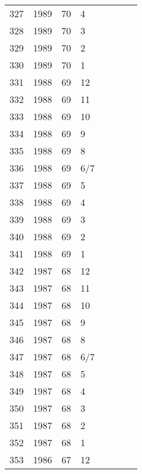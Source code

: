 \begin{longtable}{ |l|l|l|l|l|l|l|l| }
327 & 1989 & 70 &     4 &         &                &  & \\
328 & 1989 & 70 &     3 &         &                &  & \\
329 & 1989 & 70 &     2 &         &                &  & \\
330 & 1989 & 70 &     1 &         &                &  & \\
331 & 1988 & 69 &    12 &         &                &  & \\
332 & 1988 & 69 &    11 &         &                &  & \\
333 & 1988 & 69 &    10 &         &                &  & \\
334 & 1988 & 69 &     9 &         &                &  & \\
335 & 1988 & 69 &     8 &         &                &  & \\
336 & 1988 & 69 &   6/7 &         &                &  & \\
337 & 1988 & 69 &     5 &         &                &  & \\
338 & 1988 & 69 &     4 &         &                &  & \\
339 & 1988 & 69 &     3 &         &                &  & \\
340 & 1988 & 69 &     2 &         &                &  & \\
341 & 1988 & 69 &     1 &         &                &  & \\
342 & 1987 & 68 &    12 &         &                &  & \\
343 & 1987 & 68 &    11 &         &                &  & \\
344 & 1987 & 68 &    10 &         &                &  & \\
345 & 1987 & 68 &     9 &         &                &  & \\
346 & 1987 & 68 &     8 &         &                &  & \\
347 & 1987 & 68 &   6/7 &         &                &  & \\
348 & 1987 & 68 &     5 &         &                &  & \\
349 & 1987 & 68 &     4 &         &                &  & \\
350 & 1987 & 68 &     3 &         &                &  & \\
351 & 1987 & 68 &     2 &         &                &  & \\
352 & 1987 & 68 &     1 &         &                &  & \\
353 & 1986 & 67 &    12 &         &                &  & \\

\end{longtable}
